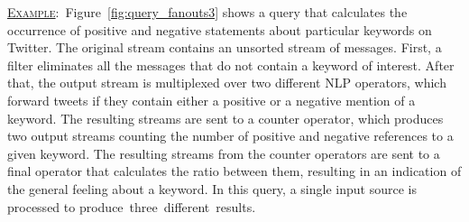 \underline{\textsc{Example}}:~Figure~\ref{fig:query_fanouts3} shows a query that calculates the occurrence
of positive and negative statements about particular keywords on Twitter. 
The original stream contains an unsorted stream of messages. First, a filter eliminates all the
messages that do not contain a keyword of interest. After that, the output stream is multiplexed over
two different NLP operators, which forward tweets if they contain
either a positive or a negative mention of a keyword. The resulting streams are sent to a counter
operator, which produces two output streams counting the number of positive and negative references to
a given keyword. The resulting streams from the counter operators are sent to a final operator that
calculates the ratio between them, resulting in an indication of the general feeling about a
keyword. In this query, a single input source is processed to produce~three~different~results.

 

